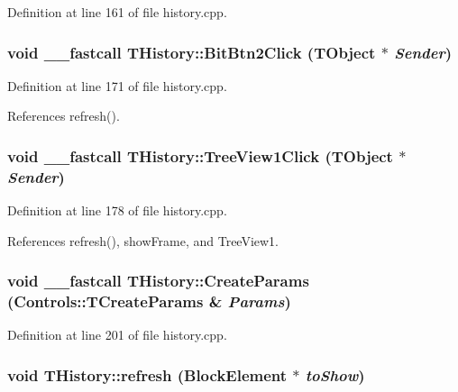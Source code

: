 Definition at line 161 of file history.cpp.\hypertarget{classTHistory_8f2cc8301b158c9845720077b2992b93}{
\subsubsection[BitBtn2Click]{\setlength{\rightskip}{0pt plus 5cm}void \_\-\_\-fastcall THistory::BitBtn2Click (TObject $\ast$ {\em Sender})}}
\label{classTHistory_8f2cc8301b158c9845720077b2992b93}




Definition at line 171 of file history.cpp.

References refresh().\hypertarget{classTHistory_4abbf05ae8c7d566b30a7ed0f87fefdf}{
\subsubsection[TreeView1Click]{\setlength{\rightskip}{0pt plus 5cm}void \_\-\_\-fastcall THistory::TreeView1Click (TObject $\ast$ {\em Sender})}}
\label{classTHistory_4abbf05ae8c7d566b30a7ed0f87fefdf}




Definition at line 178 of file history.cpp.

References refresh(), showFrame, and TreeView1.\hypertarget{classTHistory_80ff4787a2ecce89533f1fb22cb3c9b6}{
\subsubsection[CreateParams]{\setlength{\rightskip}{0pt plus 5cm}void \_\-\_\-fastcall THistory::CreateParams (Controls::TCreateParams \& {\em Params})}}
\label{classTHistory_80ff4787a2ecce89533f1fb22cb3c9b6}




Definition at line 201 of file history.cpp.\hypertarget{classTHistory_a4c0599263631652e37b50d557269974}{
\subsubsection[refresh]{\setlength{\rightskip}{0pt plus 5cm}void THistory::refresh ({\bf BlockElement} $\ast$ {\em toShow})}}
\label{classTHistory_a4c0599263631652e37b50d557269974}


